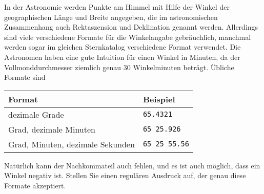 In der Astronomie werden Punkte am Himmel mit Hilfe der Winkel
der geographischen Länge und Breite angegeben, die im astronomischen
Zusammenhang auch
Rektaszension und Deklination genannt werden.
Allerdings sind viele verschiedene Formate für die
Winkelangabe gebräuchlich, manchmal werden sogar im gleichen Sternkatalog
verschiedene Format verwendet.
Die Astronomen haben eine gute Intuition für einen Winkel in Minuten,
da der Vollmonddurchmesser ziemlich genau 30 Winkelminuten beträgt.
Übliche Formate sind
\begin{center}
\begin{tabular}{ll}
Format&Beispiel\\
\hline
dezimale Grade&\texttt{65.4321}\\
Grad, dezimale Minuten&\texttt{65 25.926}\\
Grad, Minuten, dezimale Sekunden&\texttt{65 25 55.56}\\
\hline
\end{tabular}
\end{center}
Natürlich kann der Nachkommateil auch fehlen, und es ist auch möglich, dass
ein Winkel negativ ist.
Stellen Sie einen regulären Ausdruck auf, der genau diese Formate
akzeptiert. 


